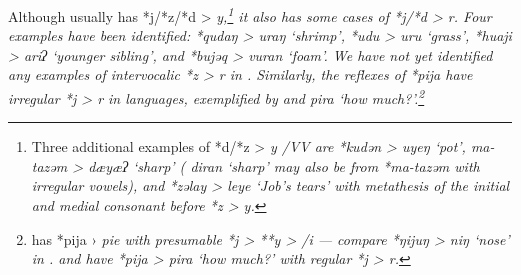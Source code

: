 Although  usually has *j/*z/*d > \it{y},\footnote{\label{fn:Kedangd/z}
		Three additional examples of  *d/*z > \it{y} /V{\gap}V
		are *kudən > \it{uyeŋ} ‘pot’,
		ma-tazəm > \it{dæyæʔ} ‘sharp’ ( \it{diran} ‘sharp’ may also
		be from *ma-tazəm with irregular vowels),
		and *zəlay > \it{leye} ‘Job’s tears’ with metathesis of the initial
		and medial consonant before *z > \it{y}.}
it also has
some cases of *j/*d > \it{r}.
Four examples have been identified: *qudaŋ > \it{uraŋ} ‘shrimp’,
*udu > \it{uru} ‘grass’,
*huaji > \it{ariʔ} ‘younger sibling’,
and *bujəq > \it{vuran} ‘foam’.
We have not yet identified any examples of intervocalic *z > \it{r} in .
Similarly, the reflexes of *pija have irregular *j > \it{r} in
 languages, exemplified by  and  \it{pira} ‘how much?’.\footnote{
		has *pija › \it{pie} with presumable *j > **y > {\0} /i{\gap}
		--- compare *ŋijuŋ > \it{niŋ} ‘nose’ in .
		 and  have *pija > \it{pira} ‘how
		much?’ with regular *j > \it{r}.}

